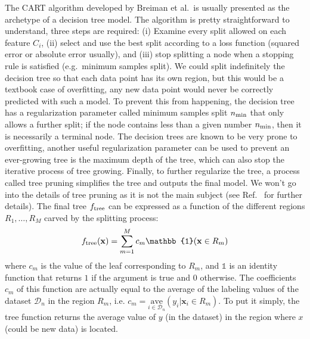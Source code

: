 \documentclass[main]{subfiles}
\begin{document}
The CART\autocite{Breiman_2017} algorithm developed by Breiman et al.\ is usually presented as the archetype of a decision tree model. The algorithm is pretty straightforward to understand, three steps are required: (i) Examine every split allowed on each feature $C_i$, (ii) select and use the best split according to a loss function (squared error or absolute error usually), and (iii) stop splitting a node when a stopping rule is satisfied (e.g.\ minimum samples split).\autocite{Dension_1998} We could split indefinitely the decision tree so that each data point has its own region, but this would be a textbook case of overfitting, any new data point would never be correctly predicted with such a model. To prevent this from happening, the decision tree has a regularization parameter called minimum samples split $n_{\text{min}}$ that only allows a further split; if the node contains less than a given number $n_{\text{min}}$, then it is necessarily a terminal node. The decision trees are known to be very prone to overfitting, another useful regularization parameter can be used to prevent an ever-growing tree is the maximum depth of the tree,  which can also stop the iterative process of tree growing. Finally, to further regularize the tree, a process called tree pruning simplifies the tree and outputs the final model. We won't go into the details of tree pruning as it is not the main subject (see Ref.~\cite{Hastie_2009} for further details). The final tree $f_{\text{tree}}$ can be expressed as a function of the different regions $R_1,\ldots,R_M$ carved by the splitting process:
\begin{equation}
  f\e{tree}(\mathbf{x}) = \sum_{m=1}^M c_m \mathbb{1}(\mathbf{x}\in R_m)
\end{equation}
where $c_m$ is the value of the leaf corresponding to $R_m$, and $\mathbb{1}$ is an identity function that returns $1$ if the argument is true and $0$ otherwise. The coefficients $c_m$ of this function are actually equal to the average of the labeling values of the dataset $\mathcal{D}_n$ in the region $R_m$, i.e. $c_m= \underset{i\in \mathcal{D}_n}{\text{ave}}(y_i|\mathbf{x}_i\in R_m)$.
To put it simply, the tree function returns the average value of $y$ (in the dataset) in the region where $x$ (could be new data) is located. 
\end{document}
